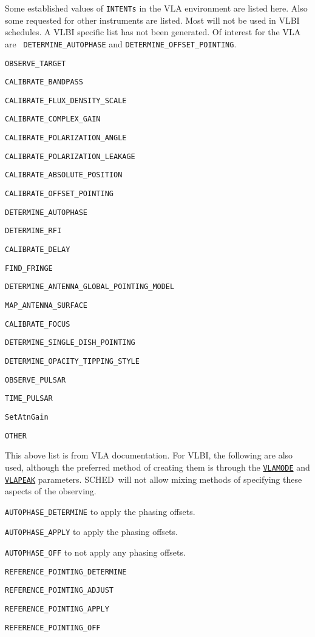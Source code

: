 \documentclass{report}
\newcommand{\schedb}{{\sc SCHED~}}
\begin{document}
Some established values of {\tt INTENTs} in the VLA environment are
listed here.  Also some requested for other instruments are listed.
Most will not be used in VLBI schedules.  A VLBI
specific list has not been generated.  Of interest for the VLA are {\tt
DETERMINE\_AUTOPHASE} and {\tt DETERMINE\_OFFSET\_POINTING}.  

\begin{list}{}{\parsep 0em  \itemsep 0em }
\item {\tt OBSERVE\_TARGET}
\item {\tt CALIBRATE\_BANDPASS}
\item {\tt CALIBRATE\_FLUX\_DENSITY\_SCALE} 
\item {\tt CALIBRATE\_COMPLEX\_GAIN}
\item {\tt CALIBRATE\_POLARIZATION\_ANGLE}
\item {\tt CALIBRATE\_POLARIZATION\_LEAKAGE}
\item {\tt CALIBRATE\_ABSOLUTE\_POSITION}
\item {\tt CALIBRATE\_OFFSET\_POINTING}
\item {\tt DETERMINE\_AUTOPHASE}
\item {\tt DETERMINE\_RFI}
\item {\tt CALIBRATE\_DELAY}
\item {\tt FIND\_FRINGE}
\item {\tt DETERMINE\_ANTENNA\_GLOBAL\_POINTING\_MODEL}
\item {\tt MAP\_ANTENNA\_SURFACE}
\item {\tt CALIBRATE\_FOCUS}
\item {\tt DETERMINE\_SINGLE\_DISH\_POINTING}
\item {\tt DETERMINE\_OPACITY\_TIPPING\_STYLE}
\item {\tt OBSERVE\_PULSAR}
\item {\tt TIME\_PULSAR}
\item {\tt SetAtnGain}
\item {\tt OTHER}
\end{list}

This above list is from VLA documentation.  For VLBI, the following
are also used, although the preferred method of creating them is
through the 
{\hyperref[MP:VLAMODE]{{\tt VLAMODE}}} and 
{\hyperref[MP:VLAPEAK]{{\tt VLAPEAK}}} parameters.  \schedb will not
allow mixing methods of specifying these aspects of the observing.

\begin{list}{}{\parsep 0em  \itemsep 0em }
\item {\tt AUTOPHASE\_DETERMINE} to apply the phasing offsets.
\item {\tt AUTOPHASE\_APPLY} to apply the phasing offsets.
\item {\tt AUTOPHASE\_OFF} to not apply any phasing offsets.
\item {\tt REFERENCE\_POINTING\_DETERMINE}
\item {\tt REFERENCE\_POINTING\_ADJUST}
\item {\tt REFERENCE\_POINTING\_APPLY}
\item {\tt REFERENCE\_POINTING\_OFF}
\end{list}
\end{document}
